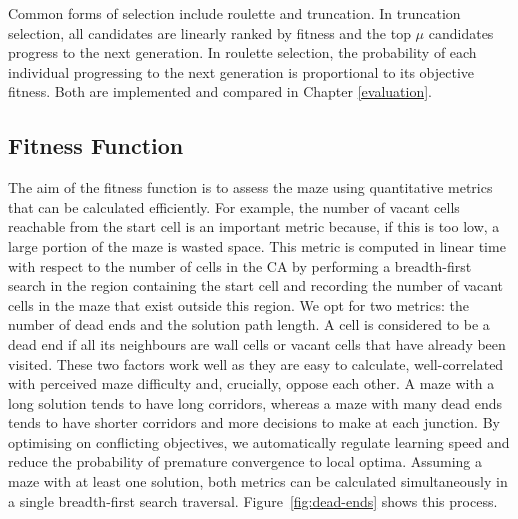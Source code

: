 
Common forms of selection include roulette and truncation. In truncation selection, all candidates are linearly ranked by fitness and the top $\mu$ candidates progress to the next generation. In roulette selection, the probability of each individual progressing to the next generation is proportional to its objective fitness. Both are implemented and compared in Chapter \ref{evaluation}.

\subsection{Fitness Function}
The aim of the fitness function is to assess the maze using quantitative metrics that can be calculated efficiently. For example, the number of vacant cells reachable from the start cell is an important metric because, if this is too low, a large portion of the maze is wasted space. This metric is computed in linear time with respect to the number of cells in the CA by performing a breadth-first search in the region containing the start cell and recording the number of vacant cells in the maze that exist outside this region. We opt for two metrics: the number of dead ends and the solution path length. A cell is considered to be a dead end if all its neighbours are wall cells or vacant cells that have already been visited. These two factors work well as they are easy to calculate, well-correlated with perceived maze difficulty\cite{adams2018evolving} and, crucially, oppose each other. A maze with a long solution tends to have long corridors, whereas a maze with many dead ends tends to have shorter corridors and more decisions to make at each junction. By optimising on conflicting objectives, we automatically regulate learning speed and reduce the probability of premature convergence to local optima. Assuming a maze with at least one solution, both metrics can be calculated simultaneously in a single breadth-first search traversal. Figure~\ref{fig:dead-ends} shows this process.\\

